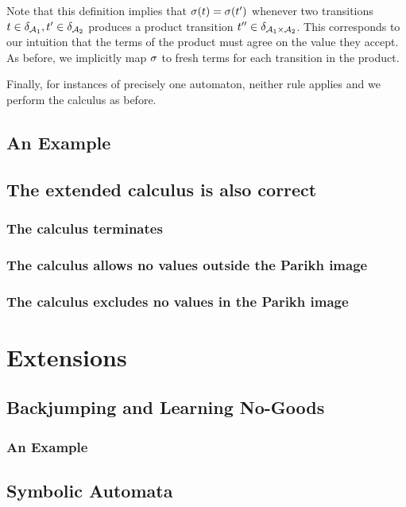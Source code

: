 \documentclass[acmsmall,review,anonymous]{acmart}\settopmatter{printfolios=true,printccs=false,printacmref=true}
\theoremstyle{definition}
\begin{document}
Note that this definition implies that $\operatorname{\sigma}(t) =
\operatorname{\sigma}(t')$ whenever two transitions $t \in
\delta_{\mathcal{A}_1}, t' \in \delta_{\mathcal{A}_2}$
produces a product transition $t'' \in \delta_{\mathcal{A}_1
\times \mathcal{A}_2}$. This corresponds to our intuition that the terms of the
product must agree on the value they accept. As before, we implicitly map
$\operatorname{\sigma}$ to fresh terms for each transition in the product.

Finally, for instances of precisely one automaton, neither rule applies and we
perform the calculus as before.

\subsection{An Example}


\subsection{The extended calculus is also correct}
\subsubsection{The calculus terminates}
\subsubsection{The calculus allows no values outside the Parikh image}
\subsubsection{The calculus excludes no values in the Parikh image}


\section{Extensions}
\subsection{Backjumping and Learning No-Goods}
\subsubsection{An Example}
\subsection{Symbolic Automata}\label{sec:ext:symbolic}
\end{document}
